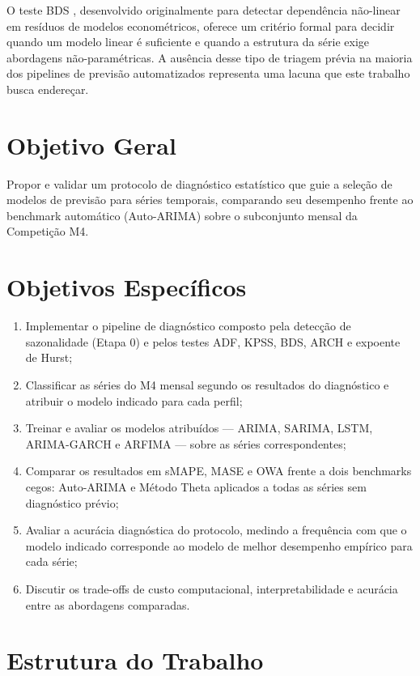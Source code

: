 \documentclass[
  12pt,
  openright,
  twoside,
  a4paper,
  english,
  brazil
]{abntex2}
\begin{document}
O teste BDS \cite{broock1996test}, desenvolvido originalmente para detectar dependência não-linear em resíduos de modelos econométricos, oferece um critério formal para decidir quando um modelo linear é suficiente e quando a estrutura da série exige abordagens não-paramétricas. A ausência desse tipo de triagem prévia na maioria dos pipelines de previsão automatizados representa uma lacuna que este trabalho busca endereçar.

\section{Objetivo Geral}
\label{sec:objetivo-geral}

Propor e validar um protocolo de diagnóstico estatístico que guie a seleção de modelos de previsão para séries temporais, comparando seu desempenho frente ao benchmark automático (Auto-ARIMA) sobre o subconjunto mensal da Competição M4.

\section{Objetivos Específicos}
\label{sec:objetivos-especificos}

\begin{enumerate}
  \item Implementar o pipeline de diagnóstico composto pela detecção de sazonalidade (Etapa 0) e pelos testes ADF, KPSS, BDS, ARCH e expoente de Hurst;
  \item Classificar as séries do M4 mensal segundo os resultados do diagnóstico e atribuir o modelo indicado para cada perfil;
  \item Treinar e avaliar os modelos atribuídos — ARIMA, SARIMA, LSTM, ARIMA-GARCH e ARFIMA — sobre as séries correspondentes;
  \item Comparar os resultados em sMAPE, MASE e OWA frente a dois benchmarks cegos: Auto-ARIMA e Método Theta aplicados a todas as séries sem diagnóstico prévio;
  \item Avaliar a acurácia diagnóstica do protocolo, medindo a frequência com que o modelo indicado corresponde ao modelo de melhor desempenho empírico para cada série;
  \item Discutir os trade-offs de custo computacional, interpretabilidade e acurácia entre as abordagens comparadas.
\end{enumerate}

\section{Estrutura do Trabalho}
\label{sec:estrutura}
\end{document}
